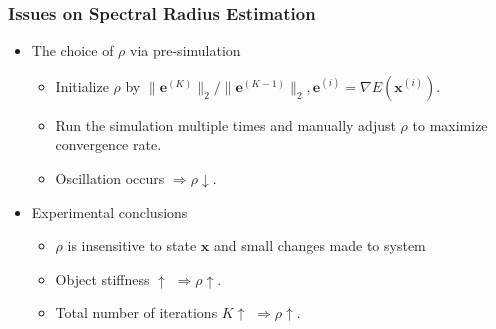 \documentclass[serif,mathserif]{beamer}
\newcommand{\BOLD}[1]{\mathbf{#1}}
\begin{document}
\begin{frame}
 \frametitle{Issues on Spectral Radius Estimation}
 \begin{itemize}
  \item The choice of $\rho$ via pre-simulation
  \begin{itemize}
   \item Initialize $\rho$ by $\|\BOLD{e}^{(K)}\|_2/\|\BOLD{e}^{(K-1)}\|_2, \BOLD{e}^{(i)} = \nabla E(\BOLD{x}^{(i)})$.
   \item Run the simulation multiple times and manually adjust $\rho$ to maximize convergence rate.
   \item Oscillation occurs$\,\, \Rightarrow \rho \downarrow$.
  \end{itemize}
  \item Experimental conclusions
  \begin{itemize}
   \item $\rho$ is insensitive to state $\BOLD{x}$ and small changes made to system
   \item Object stiffness $\uparrow \,\, \Rightarrow \rho \uparrow$.
   \item Total number of iterations $K \uparrow \,\, \Rightarrow \rho \uparrow$.
  \end{itemize}
 \end{itemize}
\end{frame}
\end{document}
